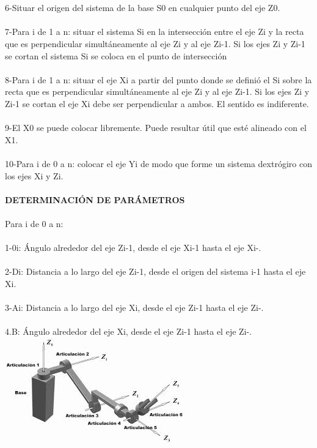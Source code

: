 \documentclass[12pt,a4paper]{article}
\begin{document}
\\\\
6-Situar el origen del sistema de la base {S0} en cualquier punto del eje Z0.
\\\\
7-Para i de 1 a n: situar el sistema {Si} en la intersección entre el eje Zi y la recta que es perpendicular simultáneamente al eje Zi y al eje Zi-1. Si los ejes Zi y Zi-1 se cortan el sistema {Si} se coloca en el punto de intersección
\\\\
8-Para i de 1 a n: situar el eje Xi a partir del punto donde se definió el {Si} sobre la recta que es perpendicular simultáneamente al eje Zi y al eje Zi-1. Si los ejes Zi y Zi-1 se cortan el eje Xi debe ser perpendicular a ambos. El sentido es indiferente.
\\\\
9-El X0 se puede colocar libremente. Puede resultar útil que esté alineado con el X1.
\\\\
10-Para i de 0 a n: colocar el eje Yi de modo que forme un sistema dextrógiro con los ejes Xi y Zi.
\\\\
\textbf{DETERMINACIÓN DE PARÁMETROS}
\\\\
Para i de 0 a n:
\\\\
1-0i: Ángulo alrededor del eje Zi-1, desde el eje Xi-1 hasta el eje Xi-.
\\\\
2-Di: Distancia a lo largo del eje Zi-1, desde el origen del sistema i-1 hasta el eje Xi.
\\\\
3-Ai: Distancia a lo largo del eje Xi, desde el eje Zi-1 hasta el eje Zi-.
\\\\
4.B: Ángulo alrededor del eje Xi, desde el eje Zi-1 hasta el eje Zi-.
\\
\includegraphics[scale=1.5]{grados.jpg} \\
\end{document}
